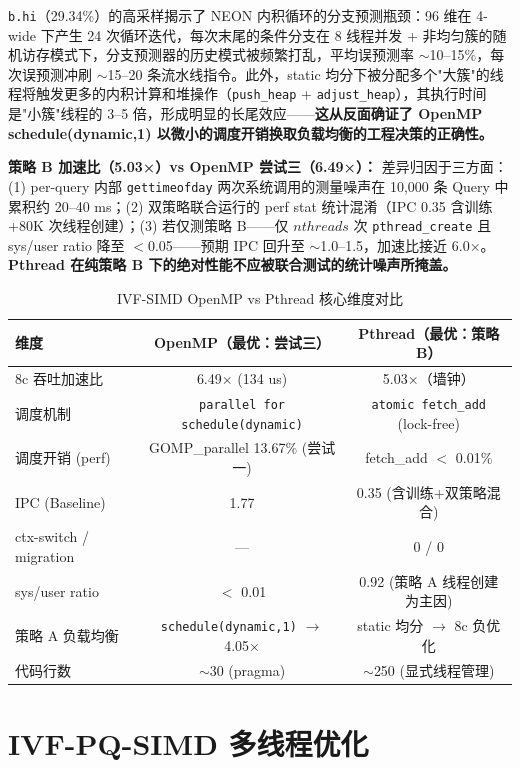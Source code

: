 \documentclass[UTF8,a4paper,10pt]{ctexart}
\begin{document}
\texttt{b.hi}（29.34\%）的高采样揭示了 NEON 内积循环的分支预测瓶颈：96 维在 4-wide 下产生 24 次循环迭代，每次末尾的条件分支在 8 线程并发 + 非均匀簇的随机访存模式下，分支预测器的历史模式被频繁打乱，平均误预测率 $\sim$10--15\%，每次误预测冲刷 $\sim$15--20 条流水线指令。此外，static 均分下被分配多个"大簇"的线程将触发更多的内积计算和堆操作（\texttt{push\_heap} + \texttt{adjust\_heap}），其执行时间是"小簇"线程的 3--5 倍，形成明显的长尾效应——\textbf{这从反面确证了 OpenMP schedule(dynamic,1) 以微小的调度开销换取负载均衡的工程决策的正确性。}

\textbf{策略 B 加速比（5.03×）vs OpenMP 尝试三（6.49×）：} 差异归因于三方面：(1) per-query 内部 \texttt{gettimeofday} 两次系统调用的测量噪声在 10,000 条 Query 中累积约 20--40 ms；(2) 双策略联合运行的 perf stat 统计混淆（IPC 0.35 含训练+80K 次线程创建）；(3) 若仅测策略 B——仅 $nthreads$ 次 \texttt{pthread\_create} 且 sys/user ratio 降至 $<$0.05——预期 IPC 回升至 $\sim$1.0--1.5，加速比接近 6.0×。\textbf{Pthread 在纯策略 B 下的绝对性能不应被联合测试的统计噪声所掩盖。}

\begin{table}[H]
\centering
\caption{IVF-SIMD OpenMP vs Pthread 核心维度对比}
\begin{tabular}{lcc}
\hline
维度 & OpenMP（最优：尝试三） & Pthread（最优：策略 B） \\
\hline
8c 吞吐加速比 & 6.49× (134 us) & 5.03×（墙钟） \\
调度机制 & \texttt{parallel for schedule(dynamic)} & \texttt{atomic fetch\_add} (lock-free) \\
调度开销 (perf) & GOMP\_parallel 13.67\% (尝试一) & fetch\_add $<$ 0.01\% \\
IPC (Baseline) & 1.77 & 0.35 (含训练+双策略混合) \\
ctx-switch / migration & — & 0 / 0 \\
sys/user ratio & $<$ 0.01 & 0.92 (策略 A 线程创建为主因) \\
策略 A 负载均衡 & \texttt{schedule(dynamic,1)} $\to$ 4.05× & static 均分 $\to$ 8c 负优化 \\
代码行数 & $\sim$30 (pragma) & $\sim$250 (显式线程管理) \\
\hline
\end{tabular}
\end{table}

\section{IVF-PQ-SIMD 多线程优化}
\end{document}
